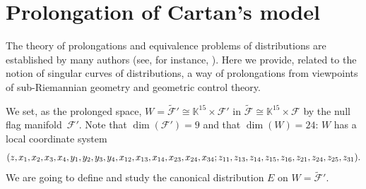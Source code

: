 \documentclass[11pt]{article}
\numberwithin{equation}{section}
\numberwithin{equation}{section}
\theoremstyle{definition}
\newcommand{\KK}{\mathbb{K}}
\newcommand{\0}{\boldsymbol{0}}
\begin{document}
\section{Prolongation of Cartan's model}
\label{Prolongation-of-Cartan's-$(8, 15)$-distribution}

The theory of prolongations and equivalence problems of distributions are established by many authors (see, for instance,
\cite{BCGGG, Montgomery, Morimoto, Tanaka1}).
Here we provide, related to the notion of singular curves of distributions, a way of prolongations
from viewpoints of sub-Riemannian geometry and geometric control theory.

We set, as the prolonged space,
$W = \widetilde{\mathcal F}' \cong \KK^{15}\times {\mathcal F}'$
in $\widetilde{\mathcal F} \cong \KK^{15}\times {\mathcal F}$
by the null flag manifold~${\mathcal F}'$.
Note that $\dim({\mathcal F}') = 9$ and that $\dim(W) = 24$:
$W$ has a local coordinate system
\begin{gather*}
(z,\hspace{-0.2pt} x_1,\hspace{-0.2pt} x_2,\hspace{-0.2pt} x_3,\hspace{-0.2pt} x_4,\hspace{-0.2pt} y_1,\hspace{-0.2pt} y_2,\hspace{-0.2pt} y_3,\hspace{-0.2pt} y_4,\hspace{-0.2pt} x_{12},\hspace{-0.2pt} x_{13},\hspace{-0.2pt} x_{14},\hspace{-0.2pt} x_{23},\hspace{-0.2pt} x_{24},\hspace{-0.2pt} x_{34};\hspace{-0.2pt}
z_{11},\hspace{-0.2pt} z_{13},\hspace{-0.2pt} z_{14},\hspace{-0.2pt} z_{15},\hspace{-0.2pt} z_{16},\hspace{-0.2pt} z_{21},\hspace{-0.2pt}
 z_{24},\hspace{-0.2pt} z_{25},\hspace{-0.2pt} z_{31}).
\end{gather*}
We are going to define and study the canonical distribution $E$ on $W = \widetilde{\mathcal F}'$.
\end{document}
